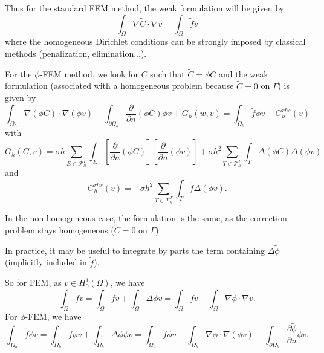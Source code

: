 Thus for the standard FEM method, the weak formulation will be given by
\begin{equation*}
	\int_\Omega \nabla\tilde{C}\cdot\nabla v=\int_\Omega \tilde{f}v
\end{equation*}
where the homogeneous Dirichlet conditions can be strongly imposed by classical methods (penalization, elimination...).

For the $\phi$-FEM method, we look for $C$ such that $\tilde{C}=\phi C$ and the weak formulation (associated with a homogeneous problem because $\tilde{C}=0$ on $\Gamma$) is given by
\begin{equation*}
	\int_{\Omega_h} \nabla (\phi C) \cdot \nabla (\phi v) - \int_{\partial\Omega_h} \frac{\partial}{\partial n}(\phi C)\phi v+G_h(w,v)=\int_{\Omega_h} \tilde{f} \phi v + G_h^{rhs}(v)
\end{equation*}
with
\begin{equation*}
	G_h(C,v)=\sigma h\sum_{E\in\mathcal{F}_h^\Gamma} \int_E \left[\frac{\partial}{\partial n}(\phi C)\right] \left[\frac{\partial}{\partial n}(\phi v)\right]+\sigma h^2\sum_{T\in\mathcal{T}_h^\Gamma} \int_{T} \Delta(\phi C)\Delta(\phi v)
\end{equation*}
and
\begin{equation*}
	G_h^{rhs}(v)=-\sigma h^2\sum_{T\in\mathcal{T}_h^\Gamma} \int_{T} \tilde{f} \Delta(\phi v).
\end{equation*}

In the non-homogeneous case, the formulation is the same, as the correction problem stays homogeneous ($\tilde{C}=0$ on $\Gamma$).

\begin{Rem}
	In practice, it may be useful to integrate by parts the term containing $\Delta \tilde{\phi}$ (implicitly included in $\tilde{f}$).
	
	So for FEM, as $v\in H_0^1(\Omega)$, we have
	\begin{equation*}
		\int_\Omega \tilde{f}v=\int_\Omega fv+\int_\Omega \Delta\tilde{\phi}v=\int_\Omega fv-\int_\Omega \nabla\tilde{\phi}\cdot\nabla v.
	\end{equation*}
	For $\phi$-FEM, we have
	\begin{equation*}
		\int_{\Omega_h} \tilde{f} \phi v=\int_{\Omega_h} f \phi v+\int_{\Omega_h} \Delta\tilde{\phi} \phi v=\int_{\Omega_h} f \phi v-\int_{\Omega_h} \nabla\tilde{\phi}\cdot\nabla(\phi v)+\int_{\partial\Omega_h} \frac{\partial\tilde{\phi}}{\partial n}\phi v.
	\end{equation*}
\end{Rem}

